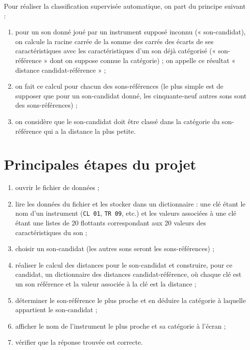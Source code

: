 Pour réaliser la classification supervisée automatique, on part du principe suivant :
\begin{enumerate}
\item pour un son donné joué par un instrument supposé inconnu (« son-candidat{\fg}), on calcule la racine carrée de la somme des carrés des écarts de ses caractéristiques avec les caractéristiques d'un son déjà catégorisé (« son-référence » dont on suppose connue la catégorie) ; on appelle ce résultat « distance candidat-référence » ;
\item on fait ce calcul pour chacun des sons-références (le plus simple est de supposer que pour un son-candidat donné, les cinquante-neuf autres sons sont des sons-références) ;
\item on considère que le son-candidat doit être classé dans la catégorie du son-référence qui a la distance la plus petite.                                                                                                                                                                                                                                                                                                                                                               \end{enumerate}

\section{Principales étapes du projet}

\begin{enumerate}
 \item ouvrir le fichier de données ;
 \item lire les données du fichier et les stocker dans un dictionnaire : une clé étant le nom d'un instrument (\texttt{CL 01}, \texttt{TR 09}, etc.) et les valeurs associées à une clé étant une listes de 20 flottants correspondant aux 20 valeurs des caractéristiques du son ;
 \item choisir un son-candidat (les autres sons seront les sons-références) ;
 \item réaliser le calcul des distances pour le son-candidat et construire, pour ce candidat, un dictionnaire des distances candidat-référence, où chaque clé est un son référence et la valeur associée à la clé est la distance ;
 \item déterminer le son-référence le plus proche et en déduire la catégorie à laquelle appartient le son-candidat ;
 \item afficher le nom de l'instrument le plus proche et sa catégorie à l'écran ;
 \item vérifier que la réponse trouvée est correcte.
\end{enumerate}

